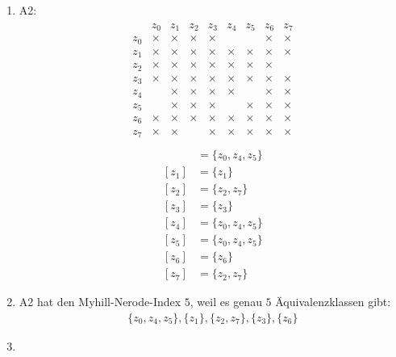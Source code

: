 \begin{enumerate}[1.]
\begin{enumerate}
      \item A2:
        \begin{align*}
          \begin{matrix}
                 & z_0    & z_1    & z_2    & z_3    & z_4    & z_5    & z_6    & z_7\\
            z_0  & \times & \times & \times & \times &        &        & \times & \times\\
            z_1  & \times & \times & \times & \times & \times & \times & \times & \times\\
            z_2  & \times & \times & \times & \times & \times & \times & \times & \\
            z_3  & \times & \times & \times & \times & \times & \times & \times & \times\\
            z_4  &        & \times & \times & \times & \times &        & \times & \times\\
            z_5  &        & \times & \times & \times &        & \times & \times & \times\\
            z_6  & \times & \times & \times & \times & \times & \times & \times & \times\\
            z_7  & \times & \times &        & \times & \times & \times & \times & \times\\
          \end{matrix}
        \end{align*}
        \begin{align*}
          [z_0] & = \{z_0, z_4, z_5\}\\
          [z_1] & = \{z_1\}\\
          [z_2] & = \{z_2, z_7\}\\
          [z_3] & = \{z_3\}\\
          [z_4] & = \{z_0, z_4, z_5\}\\
          [z_5] & = \{z_0, z_4, z_5\}\\
          [z_6] & = \{z_6\}\\
          [z_7] & = \{z_2, z_7\}
        \end{align*}

      \item A2 hat den Myhill-Nerode-Index $5$, weil es genau $5$
        Äquivalenzklassen gibt:
        \begin{align*}
          \{z_0, z_4, z_5\}, \{z_1\}, \{z_2, z_7\}, \{z_3\}, \{z_6\}
        \end{align*}

      \item \
        \begin{center}
\end{center}
\end{enumerate}
\end{enumerate}
